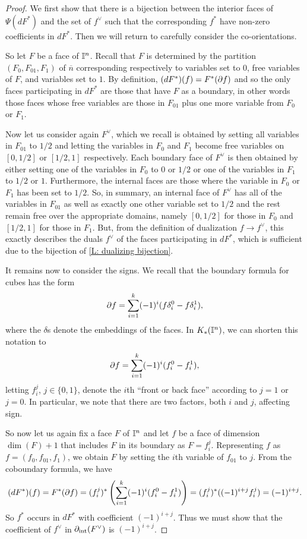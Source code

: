 \begin{proof}
	We first show that there is a bijection between the interior faces of $\Psi(d F^*)$ and the set of $f^\vee$ such that the corresponding $f^*$ have non-zero coefficients in $dF^*$.
	Then we will return to carefully consider the co-orientations.

	So let $F$ be a face of $\mathbb{I}^n$.
	Recall that $F$ is determined by the partition $(F_0,F_{01}, F_1)$ of $\overline{n}$ corresponding respectively to variables set to $0$, free variables of $F$, and variables set to $1$.
	By definition, $(dF^*)(f) = F^*(\partial f)$ and so the only faces participating in $dF^*$ are those that have $F$ as a boundary, in other words those faces whose free variables are those in $F_{01}$ plus one more variable from $F_0$ or $F_1$.

	Now let us consider again $F^\vee$, which we recall is obtained by setting all variables in $F_{01}$ to $1/2$ and letting the variables in $F_0$ and $F_1$ become free variables on $[0,1/2]$ or $[1/2,1]$ respectively.
	Each boundary face of $F^\vee$ is then obtained by either setting one of the variables in $F_0$ to $0$ or $1/2$ or one of the variables in $F_1$ to $1/2$ or $1$.
	Furthermore, the internal faces are those where the variable in $F_0$ or $F_1$ has been set to $1/2$.
	So, in summary, an internal face of $F^\vee$ has all of the variables in $F_{01}$ as well as exactly one other variable set to $1/2$ and the rest remain free over the appropriate domains, namely $[0,1/2]$ for those in $F_0$ and $[1/2,1]$ for those in $F_1$.
	But, from the definition of dualization $f \to f^\vee$, this exactly describes the duals $f^\vee$ of the faces participating in $dF^*$, which is sufficient due to the bijection of \cref{L: dualizing bijection}.

	It remains now to consider the signs.
	We recall that the boundary formula for cubes has the form
	$$\partial f = \sum_{i = 1}^k (-1)^i(f \delta_i^0-f \delta^1_i),$$ where the $\delta$s denote the embeddings of the faces.
	In $K_*(\mathbb{I}^n)$, we can shorten this notation to $$\partial f = \sum_{i = 1}^k (-1)^i(f_i^0-f^1_i),$$ letting $f_i^j$, $j \in \{0,1\}$, denote the $i$th ``front or back face'' according to $j = 1$ or $j = 0$.
	In particular, we note that there are two factors, both $i$ and $j$, affecting sign.

	So now let us again fix a face $F$ of $\mathbb{I}^n$ and let $f$ be a face of dimension $\dim(F)+1$ that includes $F$ in its boundary as $F = f_i^j$.
	Representing $f$ as $f = (f_0,f_{01},f_1)$, we obtain $F$ by setting the $i$th variable of $f_{01}$ to $j$.
	From the coboundary formula, we have
	\begin{equation*}
		(dF^*)(f) = F^*(\partial f) = (f_i^j)^*\left(\sum_{i = 1}^k (-1)^i(f_i^0-f^1_i)\right)
		= (f_i^j)^*((-1)^{i+j}f_i^j) = (-1)^{i+j}.
	\end{equation*}
	So
	$f^*$ occurs in $dF^*$ with coefficient $(-1)^{i+j}$.
	Thus we must show that the coefficient of $f^\vee$ in $\partial_{\text{int}} (F^\vee)$ is $(-1)^{i+j}$.


\end{proof}
